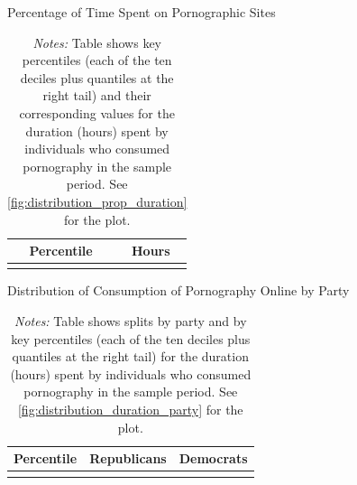\documentclass[12pt, letterpaper]{article}
\begin{document}
\begin{table}[ht] \centering \small \setlength\tabcolsep{10 pt}
	\caption{Percentage of Time Spent on Pornographic Sites}
	\label{tab:distribution_prop_duration}
	\begin{adjustbox}{max width=\textwidth}
		\begin{tabular}{cr}
			\toprule
			\multicolumn{1}{c}{\textbf{Percentile}}&\multicolumn{1}{c}{\textbf{Hours}}\\
			\midrule
			\\
			\bottomrule
		\end{tabular}
	\end{adjustbox}
	\caption*{\footnotesize \emph{Notes:} 
		Table shows key percentiles (each of the ten deciles plus quantiles at the right tail) and their corresponding values for the duration (hours) spent by individuals who consumed pornography in the sample period. 
		See \cref{fig:distribution_prop_duration} for the plot.
	}
\end{table}

\begin{table}[ht] \centering \small \setlength\tabcolsep{10 pt}
	\caption{Distribution of Consumption of Pornography Online by Party}
	\label{tab:distribution_duration_party}
	\begin{adjustbox}{max width=\textwidth}
		\begin{tabular}{crr}
			\toprule
			\multicolumn{1}{l}{\textbf{Percentile}}&\multicolumn{1}{c}{\textbf{Republicans}}&\multicolumn{1}{r}{\textbf{Democrats}}\\
			\midrule
			\\
			\bottomrule
		\end{tabular}
	\end{adjustbox}
	\caption*{\footnotesize \emph{Notes:} 
		Table shows splits by party and by key percentiles (each of the ten deciles plus quantiles at the right tail) for the duration (hours) spent by individuals who consumed pornography in the sample period. See \cref{fig:distribution_duration_party} for the plot.
	}
\end{table}
\end{document}
